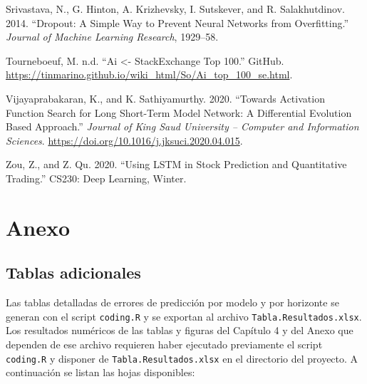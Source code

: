 \documentclass[
  12pt, a4paper, oneside]{article}
\newlength{\cslhangindent}
\newenvironment{CSLReferences}[2] %
 {\begin{list}{}{%
  \setlength{\itemindent}{0pt}
  \setlength{\leftmargin}{0pt}
  \setlength{\parsep}{0pt}
  \ifodd #1
   \setlength{\leftmargin}{\cslhangindent}
   \setlength{\itemindent}{-1\cslhangindent}
  \fi
  \setlength{\itemsep}{#2\baselineskip}}}
 {\end{list}}
\begin{document}
\begin{CSLReferences}{1}{0}
Srivastava, N., G. Hinton, A. Krizhevsky, I. Sutskever, and R. Salakhutdinov. 2014. {``Dropout: A Simple Way to Prevent Neural Networks from Overfitting.''} \emph{Journal of Machine Learning Research}, 1929--58.

Tourneboeuf, M. n.d. {``Ai \textless- StackExchange Top 100.''} GitHub. \url{https://tinmarino.github.io/wiki_html/So/Ai_top_100_se.html}.

Vijayaprabakaran, K., and K. Sathiyamurthy. 2020. {``Towards Activation Function Search for Long Short-Term Model Network: A Differential Evolution Based Approach.''} \emph{Journal of King Saud University -- Computer and Information Sciences}. \url{https://doi.org/10.1016/j.jksuci.2020.04.015}.

Zou, Z., and Z. Qu. 2020. {``Using LSTM in Stock Prediction and Quantitative Trading.''} CS230: Deep Learning, Winter.

\end{CSLReferences}

\newpage

\section{Anexo}\label{anexo}

\subsection{Tablas adicionales}\label{tablas-adicionales}

Las tablas detalladas de errores de predicción por modelo y por horizonte se generan con el script \texttt{coding.R} y se exportan al archivo \texttt{Tabla.Resultados.xlsx}. Los resultados numéricos de las tablas y figuras del Capítulo 4 y del Anexo que dependen de ese archivo requieren haber ejecutado previamente el script \texttt{coding.R} y disponer de \texttt{Tabla.Resultados.xlsx} en el directorio del proyecto. A continuación se listan las hojas disponibles:
\end{document}
